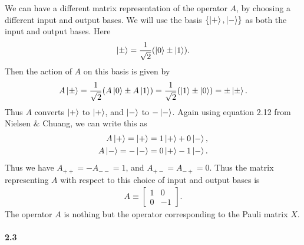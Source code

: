 We can have a different matrix representation of the operator \(A\), by choosing
a different input and output bases. We will use the basis \(\{\ket{+},
\ket{-}\}\) as both the input and output bases. Here
\begin{align}
  \label{eq:pm-basis}
  \ket{\pm} = \frac{1}{\sqrt{2}}(\ket{0} \pm \ket{1}).
\end{align}
Then the action of \(A\) on this basis is given by
\begin{align}
  \label{eq:A-action-pm}
  A\ket{\pm} = \frac{1}{\sqrt{2}}(A\ket{0} \pm A\ket{1})
  = \frac{1}{\sqrt{2}}(\ket{1} \pm \ket{0})
  = \pm \ket{\pm}.
\end{align}
Thus \(A\) converts \(\ket{+}\) to \(\ket{+}\), and \(\ket{-}\) to \(-\ket{-}\).
Again using equation 2.12 from Nielsen \& Chuang, we can write this as
\begin{align}
  \label{eq:A-matrix-representation-pm}
  \begin{split}
    A\ket{+} = \ket{+} = 1\ket{+} + 0\ket{-}, \\
    A\ket{-} = -\ket{-} = 0\ket{+} - 1\ket{-}.
  \end{split}
\end{align}
Thus we have \(A_{++} = -A_{--} = 1\), and \(A_{+-} = A_{-+} = 0\). Thus the
matrix representing \(A\) with respect to this choice of input and output bases
is
\begin{align}
  \label{eq:A-matrix-pm}
  A \equiv
  \begin{bmatrix}
    1 & 0 \\
    0 & -1
  \end{bmatrix}.
\end{align}
The operator \(A\) is nothing but the operator corresponding to the Pauli matrix
\(X\).

\paragraph{2.3}

